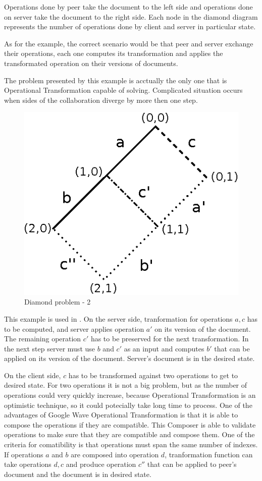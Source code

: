 \documentclass[12pt,oneside]{fithesis2}
\begin{document}
Operations done by peer take the document to the left side and operations done on server take the document to the right side. Each node in the diamond diagram represents the number of operations done by client and server in particular state. 
\par As for the example, the correct scenario would be that peer and server exchange their operations, each one computes its transformation and applies the transformated operation on their versions of documents.
\par The problem presented by this example is acctually the only one that is Operational Transformation capable of solving. Complicated situation occurs when sides of the collaboration diverge by more then one step. 
\begin{figure}[H]
\caption{Diamond problem - 2}
\label{fig:diamond2}
\centering
\vspace{5mm}
\includegraphics{diamond2}
\end{figure}
This example is used in \cite{Spiewak}. On the server side, tranformation for operations \(a,c\) has to be computed, and server applies operation \(a'\) on its version of the document. The remaining operation \(c'\) has to be preserved for the next transformation. In the next step server must use \(b\) and \(c'\) as an input and computes \(b'\) that can be applied on its version of the document. Server's document is in the desired state. 
\par On the client side, \(c\) has to be transformed against two operations to get to desired state. For two operations it is not a big problem, but as the number of operations could very quickly increase, because Operational Transformation is an optimistic technique, so it could potecially take long time to process. One of the advantages of Google Wave Operational Transformation is that it is able to compose the operations if they are compatible. This Composer is able to validate operations to make sure that they are compatible and compose them. One of the criteria for comatibility is that operations must span the same number of indexes.  If operations \(a\) and \(b\) are composed into operation \(d\), tranformation function can take operations \(d,c\) and produce operation \(c''\) that can be applied to peer's document and the document is in desired state. 
\end{document}
